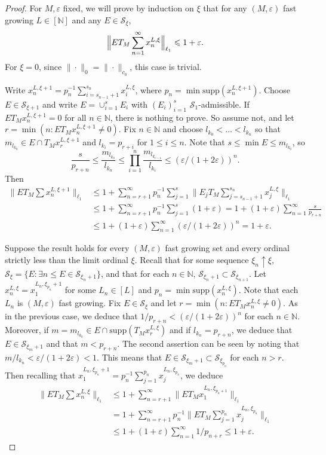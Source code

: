 \documentclass[12pt]{amsart}
\theoremstyle{definition}
\newcommand{\infin}{[\mathbb{N}]}
\newcommand{\nn}{\mathbb{N}}
\newcommand{\sss}{\mathcal{S}}
\newcommand{\supp}{\mathrm{supp}}
\begin{document}
\begin{proof} For $M, \varepsilon$ fixed, we will prove by induction on $\xi$ that for any $(M, \varepsilon)$ fast growing $L\in \infin$ and any $E\in \sss_\xi$, $$\Bigl\|ET_M\sum_{n=1}^\infty x_n^{L, \xi}\Bigr\|_{\ell_1} \leqslant 1+\varepsilon.$$ For $\xi=0$, since $\|\cdot\|_0=\|\cdot\|_{c_0}$, this case is trivial.  

Write $x^{L, \xi+1}_n= p_n^{-1}\sum_{i=s_{n-1}+1}^{s_n} x_i^{L, \xi}$, where $p_n= \min \supp(x_n^{L, \xi+1})$.  Choose $E\in \sss_{\xi+1}$ and write $E=\cup_{i=1}^s E_i$ with $(E_i)_{i=1}^s$ $\sss_1$-admissible.  If $ET_Mx_n^{L, \xi+1}=0$ for all $n\in \nn$, there is nothing to prove.  So assume not, and let $r=\min (n: ET_Mx_n^{L, \xi+1}\neq 0)$.  Fix $n\in \nn$ and choose $l_{k_0}<\ldots < l_{k_n}$ so that $m_{l_{k_0}}\in E\cap T_Mx_r^{L, \xi+1}$ and $l_{k_i}= p_{r+i}$ for $1\leqslant i\leqslant n$.  Note that $s\leqslant \min E\leqslant m_{l_{k_0}}$, so $$\frac{s}{p_{r+n}}\leqslant \frac{m_{l_{k_0}}}{l_{k_n}} \leqslant \prod_{i=1}^n \frac{m_{l_{k_{i-1}}}}{l_{k_i}}\leqslant (\varepsilon/(1+2\varepsilon))^n.$$  Then \begin{align*} \bigl\|ET_M\sum x_n^{L, \xi+1}\bigr\|_{\ell_1} & \leqslant 1 +\sum_{n=r+1}^\infty p_n^{-1}\sum_{j=1}^s \bigl\|E_jT_M \sum_{j=s_{n-1}+1}^{s_n} x_j^{L, \xi}\bigr\|_{\ell_1} \\ & \leqslant 1+ \sum_{n=r+1}^\infty p_n^{-1}\sum_{j=1}^s (1+\varepsilon) = 1+(1+\varepsilon)\sum_{n=1}^\infty \frac{s}{p_{r+n}} \\ & \leqslant 1+ (1+\varepsilon)\sum_{n=1}^\infty (\varepsilon/(1+2\varepsilon))^n = 1+\varepsilon. \end{align*}

Suppose the result holds for every $(M, \varepsilon)$ fast growing set and every ordinal strictly less than the limit ordinal $\xi$.  Recall that for some sequence $\xi_n\uparrow \xi$, $\sss_\xi=\{E: \exists n\leqslant E\in \sss_{\xi_n+1}\}$, and that for each $n\in \nn$, $\sss_{\xi_n+1}\subset \sss_{\xi_{n+1}}$.  Let $x_n^{L, \xi}=x_1^{L_n, \xi_{p_n}+1}$ for some $L_n\in [L]$ and $p_n=\min \supp(x_n^{L, \xi})$.  Note that each $L_n$ is $(M,\varepsilon)$ fast growing.  Fix $E\in \sss_\xi$ and let $r=\min (n: ET_Mx^{L, \xi}_n\neq 0)$.  As in the previous case, we deduce that $1/p_{r+n}< (\varepsilon/(1+2\varepsilon))^n$ for each $n\in \nn$.  Moreover, if $m=m_{l_{k_0}}\in E\cap \supp(T_Mx_r^{L, \xi})$ and if $l_{k_n}=p_{r+n}$, we deduce that $E\in \sss_{\xi_m+1}$ and that $m< p_{r+n}$.  The second assertion can be seen by noting that $m/l_{k_n}< \varepsilon/(1+2\varepsilon)<1$.  This means that $E\in \sss_{\xi_m+1}\subset \sss_{\xi_{p_n}}$ for each $n>r$.  Then recalling that $x_1^{L_n, \xi_{p_n}+1}= p_n^{-1}\sum_{j=1}^{p_n} x_j^{L_n, \xi_{p_n}}$, we deduce \begin{align*} \bigl\|ET_M \sum x_n^{L, \xi}\bigr\|_{\ell_1} & \leqslant 1+ \sum_{n=r+1}^\infty \|ET_Mx^{L_n, \xi_{p_n+1}}_1\|_{\ell_1} \\ & = 1+ \sum_{n=r+1}^\infty p_n^{-1}\bigl\|ET_M  \sum_{j=1}^{p_n}x_j^{L_n, \xi_{p_n}}\bigr\|_{\ell_1} \\ & \leqslant 1+ (1+\varepsilon)\sum_{n=1}^\infty 1/p_{n+r} \leqslant 1+\varepsilon. \end{align*}


\end{proof}
\end{document}
